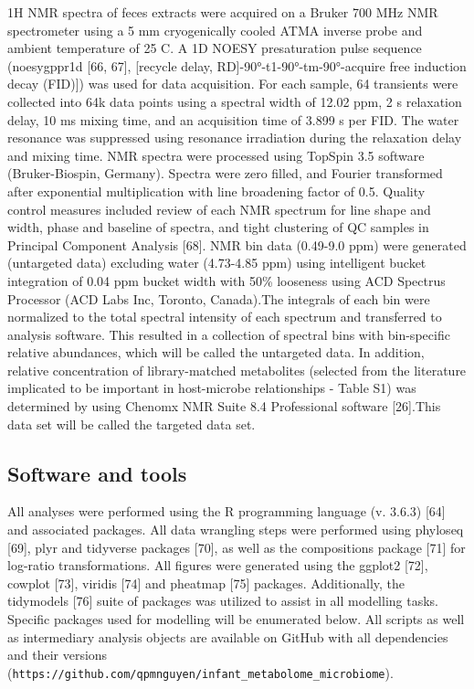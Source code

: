 1H NMR spectra of feces extracts were acquired on a Bruker 700 MHz NMR spectrometer using a 5 mm cryogenically cooled ATMA inverse probe and ambient temperature of 25 C. A 1D NOESY presaturation pulse sequence (noesygppr1d [66, 67], [recycle delay, RD]-90°-t1-90°-tm-90°-acquire free induction decay (FID)]) was used for data acquisition. For each sample, 64 transients were collected into 64k data points using a spectral width of 12.02 ppm, 2 s relaxation delay, 10 ms mixing time, and an acquisition time of 3.899 s per FID. The water resonance was suppressed using resonance irradiation during the relaxation delay and mixing time. NMR spectra were processed using TopSpin 3.5 software (Bruker-Biospin, Germany). Spectra were zero filled, and Fourier transformed after exponential multiplication with line broadening factor of 0.5. Quality control measures included review of each NMR spectrum for line shape and width, phase and baseline of spectra, and tight clustering of QC samples in Principal Component Analysis [68]. NMR bin data (0.49-9.0 ppm) were generated (untargeted data) excluding water (4.73-4.85 ppm) using intelligent bucket integration of 0.04 ppm bucket width with 50\% looseness using ACD Spectrus Processor (ACD Labs Inc, Toronto, Canada).The integrals of each bin were normalized to the total spectral intensity of each spectrum and transferred to analysis software. This resulted in a collection of spectral bins with bin-specific relative abundances, which will be called the untargeted data. In addition, relative concentration of library-matched metabolites (selected from the literature implicated to be important in host-microbe relationships - Table S1) was determined by using Chenomx NMR Suite 8.4 Professional software [26].This data set will be called the targeted data set. 
\subsection{Software and tools}
All analyses were performed using the R programming language (v. 3.6.3) [64] and associated packages. All data wrangling steps were performed using phyloseq [69], plyr and tidyverse packages [70], as well as the compositions package [71] for log-ratio transformations. All figures were generated using the ggplot2 [72], cowplot [73], viridis [74] and pheatmap [75] packages. Additionally, the tidymodels [76] suite of packages was utilized to assist in all modelling tasks. Specific packages used for modelling will be enumerated below. All scripts as well as intermediary analysis objects are available on GitHub with all dependencies and their versions (\texttt{https://github.com/qpmnguyen/infant\_metabolome\_microbiome}). 
